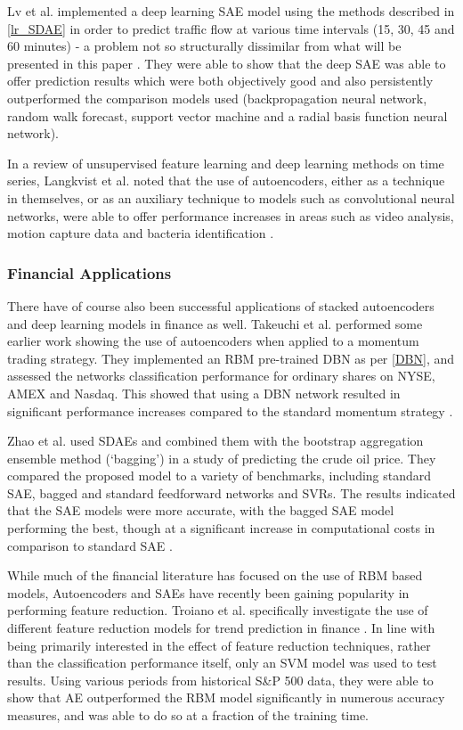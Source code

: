 \documentclass[a4paper,11pt,oneside]{article}
\theoremstyle{plain}
\theoremstyle{definition}
\begin{document}
Lv et al.  implemented a deep learning SAE model using the methods described in \ref{lr_SDAE} in order to 
predict traffic flow at various time intervals (15, 30, 45 and 60 minutes) - a problem not so structurally dissimilar 
from what will be presented in this paper \cite{Lv}. They were able to show that the deep SAE was able to offer prediction 
results which were both objectively good and also persistently outperformed the comparison models used 
(backpropagation neural network, random walk forecast, support vector machine and a radial basis function 
neural network).
\hfill \break 

In a review of unsupervised feature learning and deep learning methods on time series, Langkvist et al. noted that 
the use of autoencoders, either as a technique in themselves, or as an auxiliary technique to models 
such as convolutional neural networks, were able to offer performance increases in areas such as video analysis, 
motion capture data and bacteria identification \cite{Langkvist}.
 
\subsubsection{Financial Applications}

There have of course also been successful applications of stacked autoencoders and deep learning models in 
finance as well. Takeuchi et al. performed some earlier work showing the use of autoencoders when applied to a 
momentum trading strategy. They implemented an RBM pre-trained DBN as per \ref{DBN}, and assessed the 
networks classification performance for ordinary shares on NYSE, AMEX and Nasdaq. This showed that using a 
DBN network resulted in significant performance increases compared to the standard momentum strategy \cite{Takeuchi}.
\hfill \break 

Zhao et al. used SDAEs and combined them with the bootstrap aggregation ensemble method (‘bagging’) in a 
study of predicting the crude oil price. They compared the proposed model to a variety of benchmarks, including 
standard SAE, bagged and standard feedforward networks and SVRs. The results indicated that the SAE models 
were more accurate, with the bagged SAE model performing the best, though at a significant increase in 
computational costs in comparison to standard SAE \cite{Zhao}.
\hfill \break 

While much of the financial literature has focused on the use of RBM based models, Autoencoders and SAEs have 
recently been gaining popularity in performing feature reduction. Troiano et al. specifically investigate the use of 
different feature reduction models for trend prediction in finance \cite{Troiano}. In line with being primarily 
interested in the effect of feature reduction techniques, rather than the classification performance itself, only an 
SVM model was used to test results. Using various periods from historical S\&P 500 data, they were able to show 
that AE outperformed the RBM model significantly in numerous accuracy measures, and was able to do so at a 
fraction of the training time.
\hfill \break 
\end{document}
